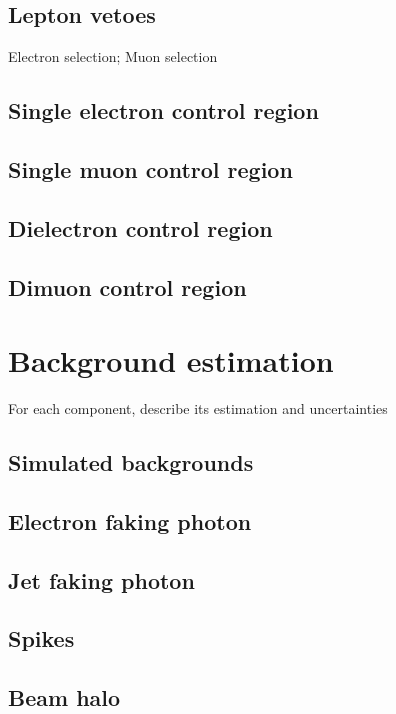 \documentclass[oneside, letterpaper, 12pt, oldfontcommands]{memoir}
\begin{document}
\section{Lepton vetoes} \label{sec:event_selection_lepveto}
Electron selection; Muon selection
\section{Single electron control region} \label{sec:event_selection_monoele}
\section{Single muon control region} \label{sec:event_selection_monomu}
\section{Dielectron control region} \label{sec:event_selection_diele}
\section{Dimuon control region} \label{sec:event_selection_dimu}

\chapter{Background estimation} \label{chap:background_estimation}
For each component, describe its estimation and uncertainties
\section{Simulated backgrounds} \label{sec:background_estimation_simulated}
\section{Electron faking photon} \label{sec:background_estimation_elefake}
\section{Jet faking photon} \label{sec:background_estimation_jetfake}
\section{Spikes} \label{sec:background_estimation_spikes}
\section{Beam halo} \label{sec:background_estimation_halo}
\end{document}
